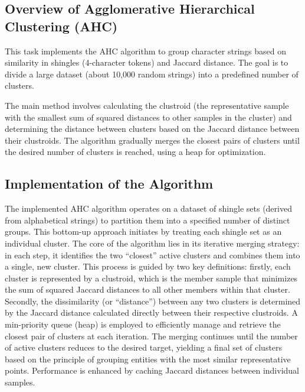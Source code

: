 \subsection{Overview of Agglomerative Hierarchical Clustering (AHC)}
\label{subsec:overview-of-agglomerative-hierarchical-clustering}

This task implements the AHC algorithm to group character strings based on similarity in shingles (4-character tokens) and Jaccard distance.
The goal is to divide a large dataset (about 10,000 random strings) into a predefined number of clusters.

The main method involves calculating the clustroid (the representative sample with the smallest sum of squared distances to other samples in the cluster) and determining the distance between clusters based on the Jaccard distance between their clustroids.
The algorithm gradually merges the closest pairs of clusters until the desired number of clusters is reached, using a heap for optimization.

\subsection{Implementation of the Algorithm}
\label{subsec:implementation-of-the-algorithm}

The implemented AHC algorithm operates on a dataset of shingle sets (derived from alphabetical strings) to partition them into a specified number of distinct groups.
This bottom-up approach initiates by treating each shingle set as an individual cluster.
The core of the algorithm lies in its iterative merging strategy: in each step, it identifies the two ``closest'' active
clusters and combines them into a single, new cluster.
This process is guided by two key definitions: firstly, each cluster is represented by a clustroid, which is the member sample that minimizes the sum of squared Jaccard distances
to all other members within that cluster.
Secondly, the dissimilarity (or ``distance'') between any two clusters is determined by the Jaccard distance calculated directly between their respective clustroids.
A min-priority queue (heap) is employed to efficiently manage and retrieve the closest pair of clusters at each iteration.
The merging continues until the number of active clusters reduces to the desired target, yielding a final set of clusters based on the principle of grouping entities with the most similar representative points.
Performance is enhanced by caching Jaccard distances between individual samples.


